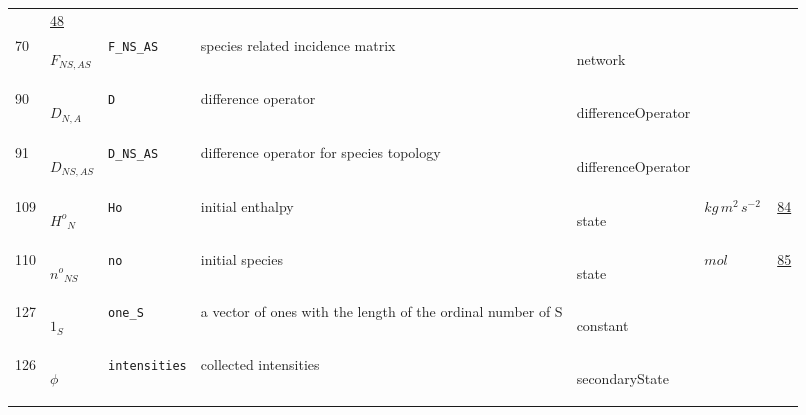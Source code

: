 \begin{longtable}{|p{1cm}|p{2.5cm}|p{4.5cm}|p{8cm}|p{3.0cm}|p{3cm}|p{1cm}|}
             &                 \hyperlink{"e:48"}{ 48 }
                 \\
            70
             & \hypertarget{"v:70"}{ $ {F}{_{{N S}, {A S}}} $}
             & \verb|F_NS_AS|
             & species related incidence matrix
             & \begin{lay}network \end{lay}
             & $  $
             & \\
            90
             & \hypertarget{"v:90"}{ $ {D}{_{N, A}} $}
             & \verb|D|
             & difference operator
             & \begin{lay}differenceOperator \end{lay}
             & $  $
             & \\
            91
             & \hypertarget{"v:91"}{ $ {D}{_{{N S}, {A S}}} $}
             & \verb|D_NS_AS|
             & difference operator for species topology
             & \begin{lay}differenceOperator \end{lay}
             & $  $
             & \\
            109
             & \hypertarget{"v:109"}{ $ {{H^o}}{_{N}} $}
             & \verb|Ho|
             & initial enthalpy
             & \begin{lay}state \end{lay}
             & $ kg \,m^{2} \,s^{-2} \, $
             &                 \hyperlink{"e:84"}{ 84 }
                 \\
            110
             & \hypertarget{"v:110"}{ $ {{n^o}}{_{{N S}}} $}
             & \verb|no|
             & initial species
             & \begin{lay}state \end{lay}
             & $ mol \, $
             &                 \hyperlink{"e:85"}{ 85 }
                 \\
            127
             & \hypertarget{"v:127"}{ $ {{1}}{_{S}} $}
             & \verb|one_S|
             & a vector of ones with the length of the ordinal number of S
             & \begin{lay}constant \end{lay}
             & $  $
             & \\
            126
             & \hypertarget{"v:126"}{ $ {\phi}{_{}} $}
             & \verb|intensities|
             & collected intensities
             & \begin{lay}secondaryState \end{lay}

\end{longtable}
